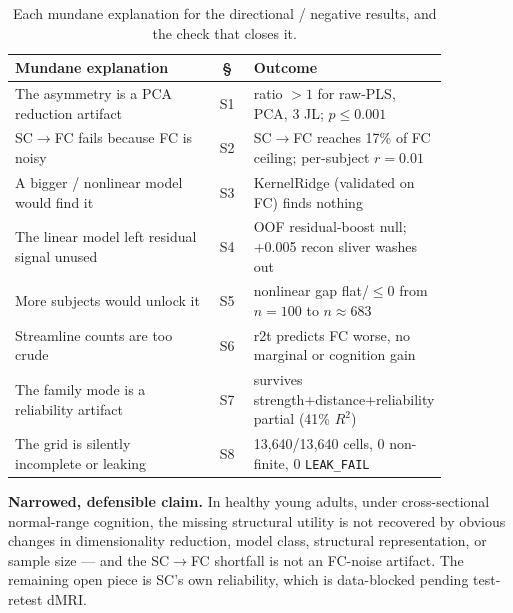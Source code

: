 \documentclass{article}
\newcommand{\scfc}{SC$\rightarrow$FC}
\begin{document}
\begin{table}[h]
\centering\small
\caption{Each mundane explanation for the directional / negative results, and the check that
closes it.}
\begin{tabular}{@{}p{0.46\linewidth} c p{0.40\linewidth}@{}}
\toprule
\textbf{Mundane explanation} & \textbf{\S} & \textbf{Outcome} \\
\midrule
The asymmetry is a PCA reduction artifact & S1 & ratio $>1$ for raw-PLS, PCA, 3 JL; $p\le 0.001$ \\
\scfc{} fails because FC is noisy & S2 & \scfc{} reaches 17\% of FC ceiling; per-subject $r=0.01$ \\
A bigger / nonlinear model would find it & S3 & KernelRidge (validated on FC) finds nothing \\
The linear model left residual signal unused & S4 & OOF residual-boost null; +0.005 recon sliver washes out \\
More subjects would unlock it & S5 & nonlinear gap flat/$\le0$ from $n{=}100$ to $n{\approx}683$ \\
Streamline counts are too crude & S6 & r2t predicts FC worse, no marginal or cognition gain \\
The family mode is a reliability artifact & S7 & survives strength+distance+reliability partial (41\% $R^2$) \\
The grid is silently incomplete or leaking & S8 & 13{,}640/13{,}640 cells, 0 non-finite, 0 \texttt{LEAK\_FAIL} \\
\bottomrule
\end{tabular}
\end{table}

\noindent
\textbf{Narrowed, defensible claim.} In healthy young adults, under cross-sectional
normal-range cognition, the missing structural utility is not recovered by obvious changes in
dimensionality reduction, model class, structural representation, or sample size --- and the
\scfc{} shortfall is not an FC-noise artifact. The remaining open piece is SC's own
reliability, which is data-blocked pending test-retest dMRI.
\end{document}
